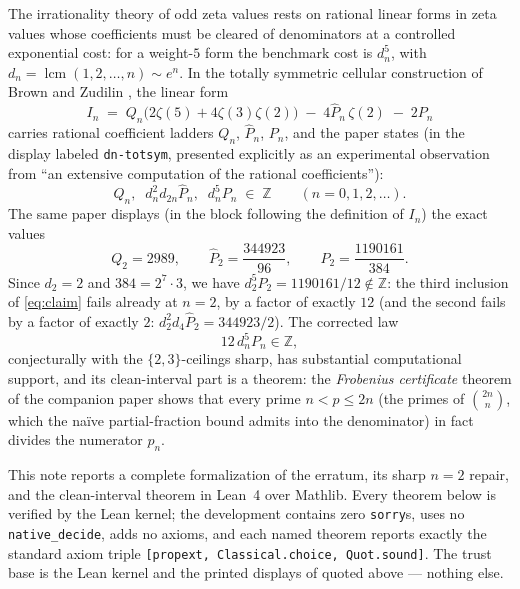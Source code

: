 \documentclass[11pt]{article}
\theoremstyle{definition}
\DeclareMathOperator{\lcm}{lcm}
\newcommand{\Z}{\mathbb{Z}}
\newcommand{\bin}[2]{\binom{#1}{#2}}
\newcommand{\lean}[1]{\texttt{#1}}
\begin{document}
The irrationality theory of odd zeta values rests on rational linear forms in
zeta values whose coefficients must be cleared of denominators at a controlled
exponential cost: for a weight-$5$ form the benchmark cost is $d_n^5$, with
$d_n = \lcm(1,2,\dots,n) \sim e^n$. In the totally symmetric cellular
construction of Brown and Zudilin \cite{BZ22}, the linear form
\begin{equation}\label{eq:In}
I_n \;=\; Q_n\bigl(2\zeta(5) + 4\zeta(3)\zeta(2)\bigr)
\;-\; 4\widehat{P}_n\,\zeta(2) \;-\; 2P_n
\end{equation}
carries rational coefficient ladders $Q_n$, $\widehat{P}_n$, $P_n$, and the
paper states (in the display labeled \lean{dn-totsym}, presented explicitly as
an experimental observation from ``an extensive computation of the rational
coefficients''):
\begin{equation}\label{eq:claim}
Q_n,\;\; d_n^2 d_{2n}\widehat{P}_n,\;\; d_n^5 P_n \;\in\; \Z
\qquad (n = 0, 1, 2, \dots).
\end{equation}
The same paper displays (in the block following the definition of $I_n$) the
exact values
\begin{equation}\label{eq:displays}
Q_2 = 2989, \qquad
\widehat{P}_2 = \frac{344923}{96}, \qquad
P_2 = \frac{1190161}{384}.
\end{equation}
Since $d_2 = 2$ and $384 = 2^7\cdot 3$, we have
$d_2^5 P_2 = 1190161/12 \notin \Z$: the third inclusion of \eqref{eq:claim}
fails already at $n = 2$, by a factor of exactly $12$
(and the second fails by a factor of exactly $2$:
$d_2^2 d_4 \widehat{P}_2 = 344923/2$). The corrected law
\begin{equation}\label{eq:corrected}
12\, d_n^5 P_n \in \Z,
\end{equation}
conjecturally with the $\{2,3\}$-ceilings sharp, has substantial computational
support, and its clean-interval part is a theorem: the \emph{Frobenius
certificate} theorem of the companion paper \cite{CBcert} shows that every
prime $n < p \le 2n$ (the primes of $\bin{2n}{n}$, which the na\"ive
partial-fraction bound admits into the denominator) in fact divides the
numerator $p_n$.

This note reports a complete formalization of the erratum, its sharp $n=2$
repair, and the clean-interval theorem in Lean~4 over Mathlib. Every theorem
below is verified by the Lean kernel; the development contains zero
\lean{sorry}s, uses no \lean{native\_decide}, adds no axioms, and each named
theorem reports exactly the standard axiom triple
\lean{[propext, Classical.choice, Quot.sound]}. The trust base is the Lean
kernel and the printed displays of \cite{BZ22} quoted above --- nothing else.
\end{document}

